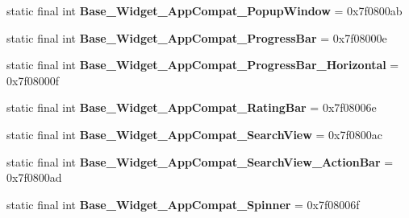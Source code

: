 \begin{DoxyCompactItemize}
\item 
\hypertarget{classandroid_1_1support_1_1v7_1_1appcompat_1_1_r_1_1style_a9d581659ad76c3760d146bf65a6c2166}{}static final int {\bfseries Base\+\_\+\+Widget\+\_\+\+App\+Compat\+\_\+\+Popup\+Window} = 0x7f0800ab\label{classandroid_1_1support_1_1v7_1_1appcompat_1_1_r_1_1style_a9d581659ad76c3760d146bf65a6c2166}

\item 
\hypertarget{classandroid_1_1support_1_1v7_1_1appcompat_1_1_r_1_1style_a23ddcd82dd90ff3db0cfbb294ced55aa}{}static final int {\bfseries Base\+\_\+\+Widget\+\_\+\+App\+Compat\+\_\+\+Progress\+Bar} = 0x7f08000e\label{classandroid_1_1support_1_1v7_1_1appcompat_1_1_r_1_1style_a23ddcd82dd90ff3db0cfbb294ced55aa}

\item 
\hypertarget{classandroid_1_1support_1_1v7_1_1appcompat_1_1_r_1_1style_ae7a6f152b019b8c804fe7dd65f1a55ed}{}static final int {\bfseries Base\+\_\+\+Widget\+\_\+\+App\+Compat\+\_\+\+Progress\+Bar\+\_\+\+Horizontal} = 0x7f08000f\label{classandroid_1_1support_1_1v7_1_1appcompat_1_1_r_1_1style_ae7a6f152b019b8c804fe7dd65f1a55ed}

\item 
\hypertarget{classandroid_1_1support_1_1v7_1_1appcompat_1_1_r_1_1style_aabdc53483e923ebf2f75d30416e7884e}{}static final int {\bfseries Base\+\_\+\+Widget\+\_\+\+App\+Compat\+\_\+\+Rating\+Bar} = 0x7f08006e\label{classandroid_1_1support_1_1v7_1_1appcompat_1_1_r_1_1style_aabdc53483e923ebf2f75d30416e7884e}

\item 
\hypertarget{classandroid_1_1support_1_1v7_1_1appcompat_1_1_r_1_1style_adf99f9c449db79c9efcec858c9d160e5}{}static final int {\bfseries Base\+\_\+\+Widget\+\_\+\+App\+Compat\+\_\+\+Search\+View} = 0x7f0800ac\label{classandroid_1_1support_1_1v7_1_1appcompat_1_1_r_1_1style_adf99f9c449db79c9efcec858c9d160e5}

\item 
\hypertarget{classandroid_1_1support_1_1v7_1_1appcompat_1_1_r_1_1style_ae6ba0c44709eea91e99cd7338c24d98b}{}static final int {\bfseries Base\+\_\+\+Widget\+\_\+\+App\+Compat\+\_\+\+Search\+View\+\_\+\+Action\+Bar} = 0x7f0800ad\label{classandroid_1_1support_1_1v7_1_1appcompat_1_1_r_1_1style_ae6ba0c44709eea91e99cd7338c24d98b}

\item 
\hypertarget{classandroid_1_1support_1_1v7_1_1appcompat_1_1_r_1_1style_a7aebba64b6a5890c12ec4fd4196b36cc}{}static final int {\bfseries Base\+\_\+\+Widget\+\_\+\+App\+Compat\+\_\+\+Spinner} = 0x7f08006f\label{classandroid_1_1support_1_1v7_1_1appcompat_1_1_r_1_1style_a7aebba64b6a5890c12ec4fd4196b36cc}


\end{DoxyCompactItemize}
